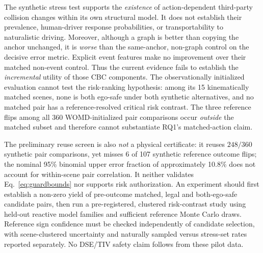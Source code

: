 \documentclass[10pt]{article}
\begin{document}
The synthetic stress test supports the \emph{existence} of action-dependent
third-party collision changes within its own structural model. It does not
establish their prevalence, human-driver response probabilities, or
transportability to naturalistic driving. Moreover, although a graph is
better than copying the anchor unchanged, it is \emph{worse} than the
same-anchor, non-graph control on the decisive error metric. Explicit event
features make no improvement over their matched non-event control. Thus the
current evidence fails to establish the \emph{incremental} utility of those
CBC components. The observationally initialized evaluation cannot test the
risk-ranking hypothesis: among its 15 kinematically matched scenes, none is
both ego-safe under both synthetic alternatives, and no matched pair has a
reference-resolved critical risk contrast. The three reference flips among
all 360 WOMD-initialized pair comparisons occur \emph{outside} the matched
subset and therefore cannot substantiate RQ1's matched-action claim.

The preliminary reuse screen is also \emph{not} a physical certificate:
it reuses $248/360$ synthetic pair comparisons, yet misses 6 of 107
synthetic reference outcome flips; the nominal 95\% binomial upper error
fraction of approximately 10.8\% does not account for within-scene pair
correlation. It neither validates Eq.~\eqref{eq:guardbounds} nor supports
risk authorization. An experiment should first establish a non-zero yield of
pre-outcome matched, legal and both-ego-safe candidate pairs, then run a
pre-registered, clustered risk-contrast study using held-out reactive model
families and sufficient reference Monte Carlo draws. Reference sign
confidence must be checked independently of candidate selection, with
scene-clustered uncertainty and naturally sampled versus stress-set rates
reported separately. No DSE/TIV safety claim follows from these pilot data.
\end{document}
